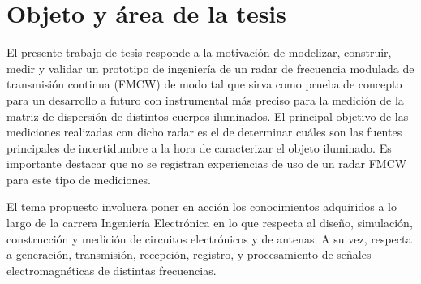 \chapter{Objeto y área de la tesis} \label{ch:object}


El presente trabajo de tesis responde a la motivación de modelizar, construir, medir y validar un prototipo de ingeniería de un radar de frecuencia modulada de transmisión continua (FMCW) de modo tal que sirva como prueba de concepto para un desarrollo a futuro con instrumental más preciso para la medición de la matriz de dispersión de distintos cuerpos iluminados. El principal objetivo de las mediciones realizadas con dicho radar es el de determinar cuáles son las fuentes principales de incertidumbre a la hora de caracterizar el objeto iluminado. Es importante destacar que no se registran experiencias de uso de un radar FMCW para este tipo de mediciones.

El tema propuesto involucra poner en acción los conocimientos adquiridos a lo largo de la carrera Ingeniería Electrónica en lo que respecta al diseño, simulación, construcción y medición de circuitos electrónicos y de antenas. A su vez, respecta a generación, transmisión, recepción, registro, y procesamiento de señales electromagnéticas de distintas frecuencias.
